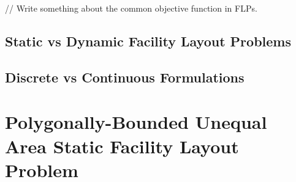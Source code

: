 // Write something about the common objective function in FLPs.

\subsection{Static vs Dynamic Facility Layout Problems}

\subsection{Discrete vs Continuous Formulations}


\section{Polygonally-Bounded Unequal Area Static Facility Layout Problem}
